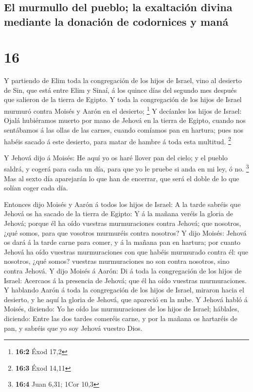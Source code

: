 \hypertarget{el-murmullo-del-pueblo-la-exaltaciuxf3n-divina-mediante-la-donaciuxf3n-de-codornices-y-manuxe1}{%
\subsection{El murmullo del pueblo; la exaltación divina mediante la
donación de codornices y
maná}\label{el-murmullo-del-pueblo-la-exaltaciuxf3n-divina-mediante-la-donaciuxf3n-de-codornices-y-manuxe1}}

\hypertarget{section-15}{%
\section{16}\label{section-15}}

 Y partiendo de Elim toda la congregación de los hijos de
Israel, vino al desierto de Sin, que está entre Elim y Sinaí, á los
quince días del segundo mes después que salieron de la tierra de Egipto.
 Y toda la congregación de los hijos de Israel murmuró
contra Moisés y Aarón en el desierto; \footnote{\textbf{16:2} Éxod 17,2}
 Y decíanles los hijos de Israel: Ojalá hubiéramos muerto
por mano de Jehová en la tierra de Egipto, cuando nos sentábamos á las
ollas de las carnes, cuando comíamos pan en hartura; pues nos habéis
sacado á este desierto, para matar de hambre á toda esta multitud.
\footnote{\textbf{16:3} Éxod 14,11}

 Y Jehová dijo á Moisés: He aquí yo os haré llover pan del
cielo; y el pueblo saldrá, y cogerá para cada un día, para que yo le
pruebe si anda en mi ley, ó no. \footnote{\textbf{16:4} Juan 6,31; 1Cor
  10,3}  Mas al sexto día aparejarán lo que han de
encerrar, que será el doble de lo que solían coger cada día.

 Entonces dijo Moisés y Aarón á todos los hijos de Israel:
A la tarde sabréis que Jehová os ha sacado de la tierra de Egipto:
 Y á la mañana veréis la gloria de Jehová; porque él ha
oído vuestras murmuraciones contra Jehová; que nosotros, ¿qué somos,
para que vosotros murmuréis contra nosotros?  Y dijo
Moisés: Jehová os dará á la tarde carne para comer, y á la mañana pan en
hartura; por cuanto Jehová ha oído vuestras murmuraciones con que habéis
murmurado contra él: que nosotros, ¿qué somos? vuestras murmuraciones no
son contra nosotros, sino contra Jehová.  Y dijo Moisés á
Aarón: Di á toda la congregación de los hijos de Israel: Acercaos á la
presencia de Jehová; que él ha oído vuestras murmuraciones.
 Y hablando Aarón á toda la congregación de los hijos de
Israel, miraron hacia el desierto, y he aquí la gloria de Jehová, que
apareció en la nube.  Y Jehová habló á Moisés, diciendo:
 Yo he oído las murmuraciones de los hijos de Israel;
háblales, diciendo: Entre las dos tardes comeréis carne, y por la mañana
os hartaréis de pan, y sabréis que yo soy Jehová vuestro Dios.


